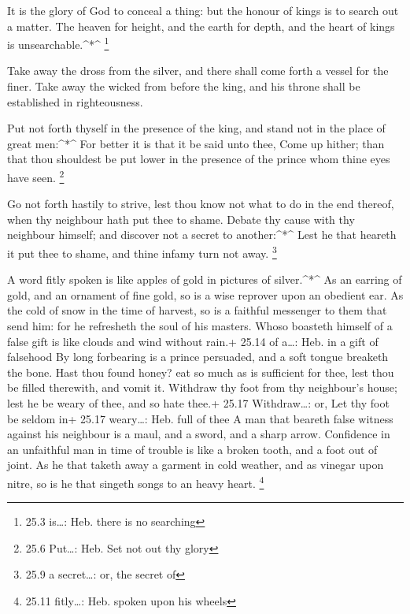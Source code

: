  It is the glory of God to conceal a thing: but the honour
of kings is to search out a matter.  The heaven for height,
and the earth for depth, and the heart of kings is
unsearchable.\^{}*\^{} \footnote{25.3 is\ldots: Heb. there is no
  searching}

 Take away the dross from the silver, and there shall come
forth a vessel for the finer.  Take away the wicked from
before the king, and his throne shall be established in righteousness.

 Put not forth thyself in the presence of the king, and
stand not in the place of great men:\^{}*\^{}  For better it
is that it be said unto thee, Come up hither; than that thou shouldest
be put lower in the presence of the prince whom thine eyes have seen.
\footnote{25.6 Put\ldots: Heb. Set not out thy glory}

 Go not forth hastily to strive, lest thou know not what to
do in the end thereof, when thy neighbour hath put thee to shame.
 Debate thy cause with thy neighbour himself; and discover
not a secret to another:\^{}*\^{}  Lest he that heareth it
put thee to shame, and thine infamy turn not away. \footnote{25.9 a
  secret\ldots: or, the secret of}

 A word fitly spoken is like apples of gold in pictures of
silver.\^{}*\^{}  As an earring of gold, and an ornament of
fine gold, so is a wise reprover upon an obedient ear.  As
the cold of snow in the time of harvest, so is a faithful messenger to
them that send him: for he refresheth the soul of his masters.
 Whoso boasteth himself of a false gift is like clouds and
wind without rain.+ 25.14 of a\ldots: Heb. in a gift of falsehood
 By long forbearing is a prince persuaded, and a soft
tongue breaketh the bone.  Hast thou found honey? eat so
much as is sufficient for thee, lest thou be filled therewith, and vomit
it.  Withdraw thy foot from thy neighbour's house; lest he
be weary of thee, and so hate thee.+ 25.17 Withdraw\ldots: or, Let thy
foot be seldom in+ 25.17 weary\ldots: Heb. full of thee  A
man that beareth false witness against his neighbour is a maul, and a
sword, and a sharp arrow.  Confidence in an unfaithful man
in time of trouble is like a broken tooth, and a foot out of joint.
 As he that taketh away a garment in cold weather, and as
vinegar upon nitre, so is he that singeth songs to an heavy heart.
\footnote{25.11 fitly\ldots: Heb. spoken upon his wheels}


